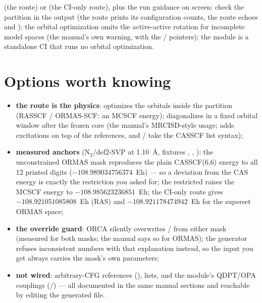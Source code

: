  (the  route) or
 (the CI-only route), plus the run guidance on
screen: check the partition in the output (the  route prints
its configuration counts, the  route echoes
 and ); the
orbital optimization omits the active-active rotation for incomplete model
spaces (the manual's own warning, with the  /
 pointers); the  module is a standalone
CI that runs no orbital optimization.

\section{Options worth knowing}

\begin{readbox}
\begin{itemize}
  \item \textbf{the route is the physics}:  optimizes the
    orbitals inside the partition (RASSCF / ORMAS-SCF\@: an MCSCF energy);
     diagonalizes in a fixed orbital window after the frozen
    core (the manual's MRCISD-style usage;  adds excitations
    on top of the references, and / take the CASSCF
    list syntax);
  \item \textbf{measured anchors} (N$_2$/def2-SVP at 1.10~\AA, fixtures
    , , ): the
    unconstrained ORMAS mask reproduces the plain CASSCF(6,6) energy to all
    12 printed digits ($-108.989034756374$~Eh) --- so a deviation from the
    CAS energy is exactly the restriction you asked for; the restricted
     raises the MCSCF energy to
    $-108.985623236851$~Eh; the CI-only route gives $-108.921051085808$~Eh
    (RAS) and $-108.921178474942$~Eh for the superset ORMAS space;
  \item \textbf{the override guard}: ORCA silently overwrites
    / from either mask (measured for both masks; the
    manual says so for ORMAS); the generator refuses inconsistent numbers
    with that explanation instead, so the input you get always carries the
    mask's own parameters;
  \item \textbf{not wired}: arbitrary-CFG references
    (),  lists, and the 
    module's QDPT/OPA couplings (/) --- all documented
    in the same manual sections and reachable by editing the generated
    file.
\end{itemize}
\end{readbox}
